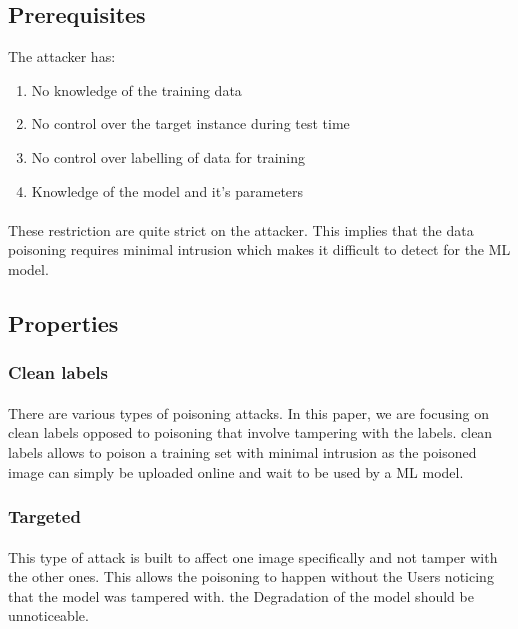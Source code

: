\documentclass{article}
\begin{document}
\subsection{Prerequisites}

The attacker has:
\begin{enumerate}
  \item No knowledge of the training data
  \item No control over the target instance during test time
  \item No control over labelling of data for training
  \item Knowledge of the model and it's parameters
\end{enumerate}
\paragraph{}
These restriction are quite strict on the attacker. This implies that the data poisoning requires minimal intrusion which makes it difficult to detect for the ML model.
\subsection{Properties}

\subsubsection*{Clean labels}
\paragraph{}
There are various types of poisoning attacks. In this paper, we are focusing on clean labels opposed to poisoning that involve tampering with the labels. clean labels allows to poison a training set with minimal intrusion as the poisoned image can simply be uploaded online and wait to be used by a ML model.

\subsubsection*{Targeted}
\paragraph{}
This type of attack is built to affect one image specifically and not tamper with the other ones. This allows the poisoning to happen without the Users noticing that the model was tampered with. the Degradation of the model should be unnoticeable.
\end{document}
